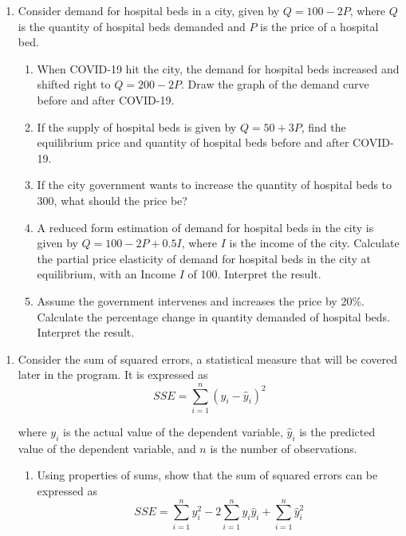 \documentclass{article}
\begin{document}
\begin{enumerate}[resume]
    \item Consider demand for hospital beds in a city, given by $Q = 100 - 2P$, where $Q$ is the quantity of hospital beds demanded and $P$ is the price of a hospital bed. 
    \begin{enumerate}
        \item When COVID-19 hit the city, the demand for hospital beds increased and shifted right to $Q = 200 - 2P$. Draw the graph of the demand curve before and after COVID-19.
        \item If the supply of hospital beds is given by $Q = 50 + 3P$, find the equilibrium price and quantity of hospital beds before and after COVID-19. 
        \item If the city government wants to increase the quantity of hospital beds to 300, what should the price be?
        \item A reduced form estimation of demand for hospital beds in the city is given by $Q = 100 - 2P + 0.5I$, where $I$ is the income of the city. Calculate the partial price elasticity of demand for hospital beds in the city at equilibrium, with an Income $I$ of 100. Interpret the result.
        \item Assume the government intervenes and increases the price by 20\%. Calculate the percentage change in quantity demanded of hospital beds. Interpret the result. 
    \end{enumerate}
\end{enumerate}

\begin{enumerate}[resume]
    \item Consider the sum of squared errors, a statistical measure that will be covered later in the program. It is expressed as $$SSE = \sum_{i=1}^{n} (y_i - \hat{y}_i)^2$$

    where $y_i$ is the actual value of the dependent variable, $\hat{y}_i$ is the predicted value of the dependent variable, and $n$ is the number of observations.
\begin{enumerate}
    \item Using properties of sums, show that the sum of squared errors can be expressed as $$SSE = \sum_{i=1}^{n} y_i^2 - 2\sum_{i=1}^{n} y_i\hat{y}_i + \sum_{i=1}^{n} \hat{y}_i^2$$
\end{enumerate}
\end{enumerate}
\end{document}
